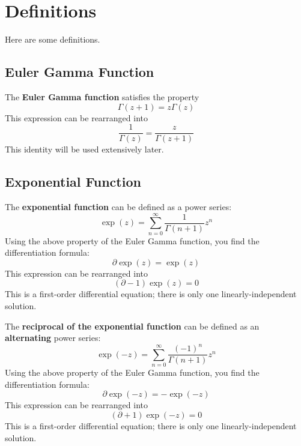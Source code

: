 \chapter{Definitions}
Here are some definitions.
\section{Euler Gamma Function}
The \textbf{Euler Gamma function} satisfies the property
\begin{equation}
    \Gamma(z + 1) = z \Gamma(z)
\end{equation}
This expression can be rearranged into
\begin{equation}
    \frac{1}{\Gamma(z)} = \frac{z}{\Gamma(z + 1)}
\end{equation}
This identity will be used extensively later.
\section{Exponential Function}
The \textbf{exponential function} can be defined as a power series:
\begin{equation}
    \exp(z) = \sum_{n = 0}^{\infty} \frac{1}{\Gamma(n + 1)} z^{n}
\end{equation}
Using the above property of the Euler Gamma function, you find the differentiation formula:
\begin{equation}
    \partial \exp(z) = \exp(z)
\end{equation}
This expression can be rearranged into
\begin{equation}
    \left( \partial - 1 \right) \exp(z) = 0
\end{equation}
This is a first-order differential equation; there is only one linearly-independent solution.

The \textbf{reciprocal of the exponential function} can be defined as an \textbf{alternating} power series:
\begin{equation}
    \exp({-z}) = \sum_{n = 0}^{\infty} \frac{(-1)^{n}}{\Gamma(n + 1)} z^{n}
\end{equation}
Using the above property of the Euler Gamma function, you find the differentiation formula:
\begin{equation}
    \partial \exp({-z}) = -\exp({-z})
\end{equation}
This expression can be rearranged into
\begin{equation}
    \left( \partial + 1 \right) \exp({-z}) = 0
\end{equation}
This is a first-order differential equation; there is only one linearly-independent solution.

